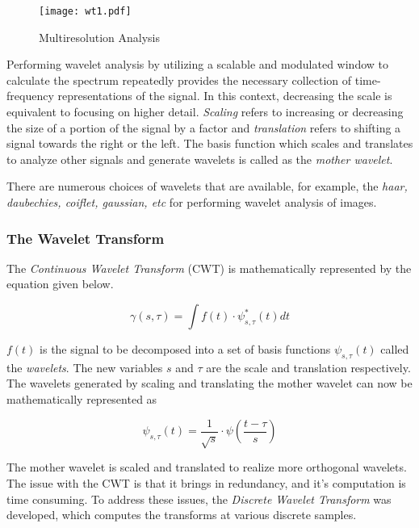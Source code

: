 \documentclass[./A14_Report.tex]{subfiles}
\begin{document}
\FloatBarrier
\begin{figure}[htpb]
    \centering
    \texttt{[image: wt1.pdf]}
    \caption{Multiresolution Analysis}%
    \label{fig:multiresolution}
\end{figure}
\FloatBarrier

\par

Performing wavelet analysis by utilizing a scalable and modulated window to calculate the
spectrum repeatedly provides the necessary collection of time-frequency representations 
of the signal. In this context, decreasing the scale is equivalent to focusing on higher
detail. \textit{Scaling} refers to increasing or decreasing the size of a portion of the signal 
by a factor and \textit{translation} refers to shifting a signal towards the right or the left.
The basis function which scales and translates to analyze other signals and generate
wavelets is called as the \textit{mother wavelet}. 

\par

There are numerous choices of wavelets that are available, for example, the \textit{haar, daubechies, 
coiflet, gaussian, etc} for performing wavelet analysis of images. 

\subsubsection{The Wavelet Transform}%
\label{sec:the_wavelet_transform}

The \textit{Continuous Wavelet Transform} (CWT) is mathematically represented by the
equation given below.

\[\gamma(s, \tau) = \int f(t)\cdot\psi^{*}_{s, \tau}(t)dt\]

\(f(t)\) is the signal to be decomposed into a set of basis functions \(\psi_{s,\tau}(t)\)
called the \textit{wavelets}. The new variables \(s\) and $\tau$ are the scale and translation
respectively. The wavelets generated by scaling and translating the mother wavelet
can now be mathematically represented as

$$\psi_{s,\tau}(t)=\frac{1}{\sqrt{s}}\cdot\psi \left (\frac{t-\tau}{s} \right)$$

The mother wavelet is scaled and translated to realize more orthogonal wavelets.
The issue with the CWT is that it brings in redundancy, and it's computation is time consuming.
To address these issues, the \textit{Discrete Wavelet Transform} was developed, 
which computes the transforms at various discrete samples.
\end{document}

